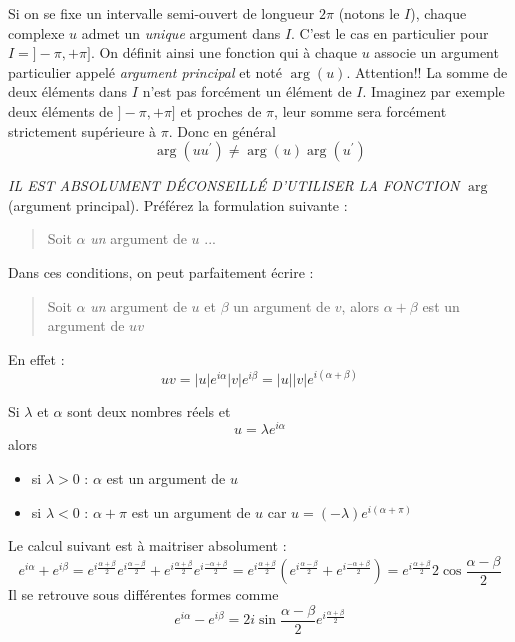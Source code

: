 \begin{defi}
\begin{rems}
\item Si on se fixe un intervalle semi-ouvert de longueur $2\pi$ (notons le $I$), chaque complexe $u$ admet un \emph{unique} argument dans $I$. C'est le cas en particulier pour $I=]-\pi,+\pi]$. On définit ainsi une fonction qui à chaque $u$ associe un argument particulier appelé \emph{argument principal} et noté $\arg (u)$.\newline
Attention!! La somme de deux éléments dans $I$ n'est pas forcément un élément de $I$. Imaginez par exemple deux éléments de $]-\pi,+\pi]$ et proches de $\pi$, leur somme sera forcément strictement supérieure à $\pi$. Donc en général 
\begin{displaymath}
 \arg(uu^\prime) \neq \arg(u)\arg(u^\prime)
\end{displaymath}
\item \emph{IL EST ABSOLUMENT D\'ECONSEILL\'E D'UTILISER LA FONCTION} $\arg$ (argument principal). Préférez la formulation suivante :
\begin{quote}
 Soit $\alpha$ \emph{un} argument de $u$ ...
\end{quote}
Dans ces conditions, on peut parfaitement écrire :
\begin{quote}
 Soit $\alpha$ \emph{un} argument de $u$ et $\beta$ un argument de $v$, alors $\alpha + \beta$ est un argument de $uv$
\end{quote}
En effet :
\begin{displaymath}
 uv = |u|e^{i\alpha}|v|e^{i\beta} = |u||v|e^{i(\alpha+\beta)}
\end{displaymath}
\item Si $\lambda$ et $\alpha$ sont deux nombres réels et
\begin{displaymath}
 u = \lambda e^{i\alpha}
\end{displaymath}
alors
\begin{itemize}
 \item si $\lambda >0$ : $\alpha$ est un argument de $u$
\item  si $\lambda <0$ : $\alpha + \pi$ est un argument de $u$ car $u=(-\lambda)e^{i(\alpha + \pi)}$
\end{itemize}
\end{rems}
\end{defi}

\begin{exple}
Le calcul suivant est à maitriser absolument  :
\begin{displaymath}
 e^{i\alpha} + e^{i\beta} 
= e^{i\frac{\alpha + \beta}{2}}e^{i\frac{\alpha - \beta}{2}} 
+
e^{i\frac{\alpha + \beta}{2}}e^{i\frac{-\alpha + \beta}{2}}
= e^{i\frac{\alpha + \beta}{2}}\left( e^{i\frac{\alpha - \beta}{2}} + e^{i\frac{-\alpha + \beta}{2}}\right)
=  e^{i\frac{\alpha + \beta}{2}} 2 \cos \frac{\alpha - \beta}{2}
\end{displaymath}
Il se retrouve sous différentes formes comme 
\begin{displaymath}
 e^{i\alpha} - e^{i\beta}  = 2i \sin \frac{\alpha - \beta}{2}  e^{i\frac{\alpha + \beta}{2}}
\end{displaymath}
\end{exple}

